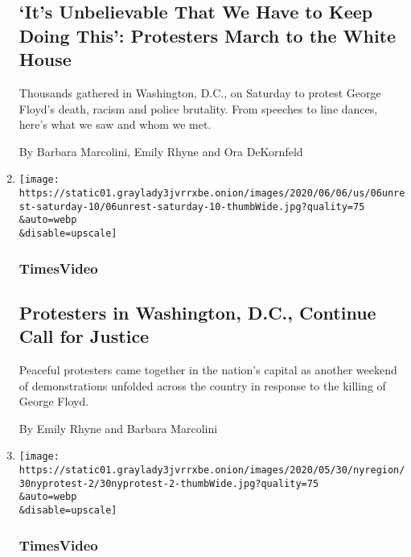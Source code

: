 \begin{enumerate}
  \hypertarget{its-unbelievable-that-we-have-to-keep-doing-this-protesters-march-to-the-white-house}{%
  \subsection{`It's Unbelievable That We Have to Keep Doing This':
  Protesters March to the White
  House}\label{its-unbelievable-that-we-have-to-keep-doing-this-protesters-march-to-the-white-house}}

  Thousands gathered in Washington, D.C., on Saturday to protest George
  Floyd's death, racism and police brutality. From speeches to line
  dances, here's what we saw and whom we met.

  By Barbara Marcolini, Emily Rhyne and Ora DeKornfeld
\item
  \href{/video/us/politics/100000007177962/washington-dc-protest-george-floyd.html}{}

  \texttt{[image: https://static01.graylady3jvrrxbe.onion/images/2020/06/06/us/06unrest-saturday-10/06unrest-saturday-10-thumbWide.jpg?quality=75\\\&auto=webp\\\&disable=upscale]}

  \hypertarget{timesvideo-4}{%
  \subsubsection{TimesVideo}\label{timesvideo-4}}

  \hypertarget{protesters-in-washington-dc-continue-call-for-justice}{%
  \subsection{Protesters in Washington, D.C., Continue Call for
  Justice}\label{protesters-in-washington-dc-continue-call-for-justice}}

  Peaceful protesters came together in the nation's capital as another
  weekend of demonstrations unfolded across the country in response to
  the killing of George Floyd.

  By Emily Rhyne and Barbara Marcolini
\item
  \href{/video/us/100000007165466/george-floyd-protest-nyc.html}{}

  \texttt{[image: https://static01.graylady3jvrrxbe.onion/images/2020/05/30/nyregion/30nyprotest-2/30nyprotest-2-thumbWide.jpg?quality=75\\\&auto=webp\\\&disable=upscale]}

  \hypertarget{timesvideo-5}{%
  \subsubsection{TimesVideo}\label{timesvideo-5}}


\end{enumerate}
